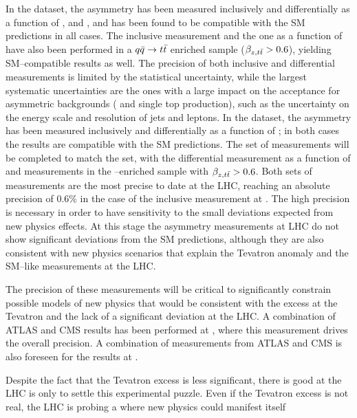 In the \seventev{} dataset, the asymmetry \ac{} has been measured
inclusively and differentially as a function of \mtt{}, \pttt{} and \ytt{}, and has been found
to be compatible with the SM predictions in all cases. The inclusive
measurement and the one as a function of \mtt{} have also been performed in
a $q\bar{q}{}\to t\bar{t}{}$ enriched sample ($\beta_{z,t\bar{t}}{}>0.6$), yielding
SM--compatible results as well. The precision of both inclusive and
differential measurements is limited by the statistical uncertainty,
while the largest systematic uncertainties are the ones with a large
impact on the acceptance for asymmetric backgrounds (\wjets{} and
single top production), such as the uncertainty on the energy scale and
resolution of jets and leptons.
In the \eighttev{} dataset, the asymmetry \ac{} has been measured
inclusively and differentially as a function of \mtt{}; in both cases the results are
compatible with the SM predictions. The set of measurements will be
completed to match the \seventev{} set, with the differential
measurement as a function of \pttt{} and measurements in the
\qqbar{}--enriched sample with $\beta_{z,t\bar{t}}{}>0.6$.
Both sets of measurements are the most precise to date at the LHC,
reaching an absolute precision of 0.6\% in the case of the inclusive measurement
at \eighttev{}. The high precision is necessary in order to have
sensitivity to the small deviations expected from new physics effects.
At this stage the asymmetry measurements at LHC do not show
significant deviations from the SM predictions, although they are also
consistent with new physics scenarios that explain the Tevatron
anomaly and the SM--like \ac{} measurements at the LHC.

The precision of these measurements will be critical to significantly
constrain possible models of new physics that would be consistent with
the excess at the Tevatron and the lack of a significant deviation at
the LHC. A combination of ATLAS and CMS results has been performed at
\seventev{}, where this measurement drives the overall precision. A
combination of measurements from ATLAS and CMS is also foreseen for
the results at \eighttev{}.

Despite the fact that the Tevatron excess is less significant, there
is good 
at the LHC is only to settle this experimental puzzle. Even if the
Tevatron excess is not real, the LHC is probing a 
where new physics could manifest itself 

